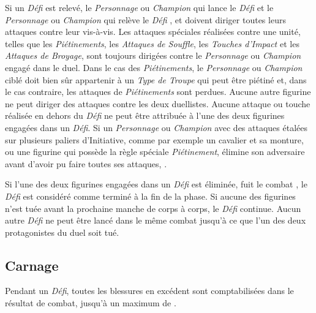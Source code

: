 Si un \emph{Défi} est relevé, le \emph{Personnage} ou \emph{Champion} qui lance le \emph{Défi} et le \emph{Personnage} ou \emph{Champion} qui relève le \emph{Défi} , et doivent diriger toutes leurs attaques contre leur vis-à-vis. Les attaques spéciales réalisées contre une unité, telles que les \emph{Piétinements}, les \emph{Attaques de Souffle}, les \emph{Touches d’Impact} et les \emph{Attaques de Broyage}, sont toujours dirigées contre le \emph{Personnage} ou \emph{Champion} engagé dans le duel. Dans le cas des \emph{Piétinements}, le \emph{Personnage} ou \emph{Champion} ciblé doit bien sûr appartenir à un \emph{Type de Troupe} qui peut  être piétiné et, dans le cas contraire, les attaques de \emph{Piétinements} sont perdues. Aucune autre figurine ne peut diriger des attaques contre les deux duellistes. Aucune attaque ou touche réalisée en dehors du \emph{Défi} ne peut être attribuée à l'une des deux figurines engagées dans un \emph{Défi}. Si un \emph{Personnage} ou \emph{Champion} avec des attaques étalées sur plusieurs paliers d'Initiative, comme par exemple un cavalier et sa monture, ou une figurine qui possède la règle spéciale \emph{Piétinement}, élimine son adversaire avant d'avoir pu faire toutes ses attaques, .

Si l'une des deux figurines engagées dans un \emph{Défi} est éliminée, fuit le combat , le \emph{Défi} est considéré comme terminé à la fin de la phase. Si aucune des figurines n'est tuée avant la prochaine manche de corps à corps, le \emph{Défi} continue. Aucun autre \emph{Défi} ne peut être lancé dans le même combat jusqu'à ce que l'un des deux protagonistes du duel soit tué.

\subsection{Carnage}

Pendant un \emph{Défi}, toutes les blessures en excédent sont comptabilisées dans le résultat de combat, jusqu'à un maximum de .
